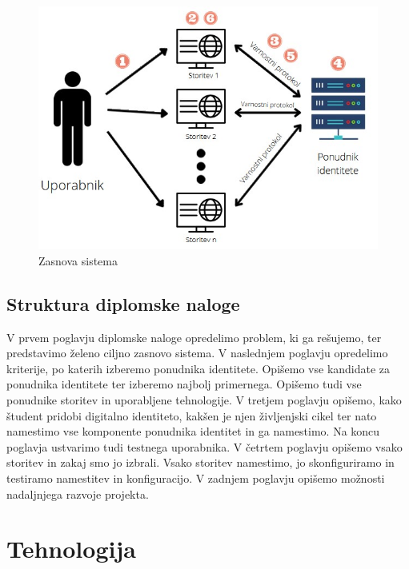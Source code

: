 \documentclass[a4paper,12pt,openright,oneside]{book}
\begin{document}
\begin{figure}[H]
\hspace{-0cm}
\includegraphics[scale=0.85]{diploma-FRI-vzorec_11maj2021/Prof_sistem.jpg}
\caption{Zasnova sistema}
\label{fig:zasnova sistema}
\end{figure}

\section{Struktura diplomske naloge}
V prvem poglavju diplomske naloge opredelimo problem, ki ga rešujemo, ter predstavimo želeno ciljno zasnovo sistema. 
V naslednjem poglavju opredelimo kriterije, po katerih izberemo ponudnika identitete. Opišemo vse kandidate za ponudnika identitete ter izberemo najbolj primernega. Opišemo tudi vse ponudnike storitev in uporabljene tehnologije. 
V tretjem poglavju opišemo, kako študent pridobi digitalno identiteto, kakšen je njen življenjski cikel ter nato namestimo vse komponente ponudnika identitet in ga namestimo. Na koncu poglavja ustvarimo tudi testnega uporabnika. 
V četrtem poglavju opišemo vsako storitev in zakaj smo jo izbrali. Vsako storitev namestimo, jo skonfiguriramo in testiramo namestitev in konfiguracijo. 
V zadnjem poglavju opišemo možnosti nadaljnjega razvoje projekta.
\cleardoublepage
\chapter{Tehnologija}
\end{document}

